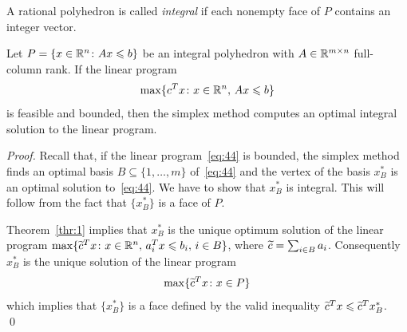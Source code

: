 \begin{definition}
  \label{def:12}  
  A rational polyhedron   is called \emph{integral} 
  if  each nonempty face of $P$ contains an integer vector. 
\end{definition}



\begin{lemma}
  \label{lem:9}
  Let $P = \{ x \in \mathbb{R}^n \colon Ax\leqslant b\}$ be an integral polyhedron with $A
  \in \mathbb{R}^{m\times n}$ full-column rank. If the linear program 
  \begin{equation}
    \label{eq:44}
    \max\{c^Tx \colon x \in \mathbb{R}^n, \, Ax\leqslant b\}
  \end{equation}
  is feasible and bounded, then the simplex method computes an optimal
  integral solution to the linear program. 
\end{lemma}


\begin{proof}
  Recall that, if the linear program~\eqref{eq:44} is bounded, the simplex method finds an optimal basis $B
  \subseteq\{1,\ldots,m\}$ of~\eqref{eq:44} and the vertex of the basis $x^*_B$ is
  an optimal solution to~\eqref{eq:44}. We have to
  show that $x^*_B$ is integral. This will follow from the fact that
  $\{x^*_B\}$ is a face of $P$.

  Theorem~\ref{thr:1} implies that $x^*_B$ is the unique optimum
  solution of the linear program $\max\{\widetilde{c}^T x \colon x \in 
  \mathbb{R}^n, \,
  a_i^Tx \leqslant b_i, \, i \in B\}$, where $\widetilde{c} = \sum_{i \in B} a_i$.
  Consequently $x^*_B$ is the unique solution of the linear program
  \begin{displaymath}
    \max\{\widetilde{c}^Tx \colon x \in P\}
  \end{displaymath}
  which implies that $\{x^*_B\}$ is a face defined by the valid
  inequality $\widetilde{c}^Tx \leqslant \widetilde{c}^Tx^*_B$.  \qed 
\end{proof}




